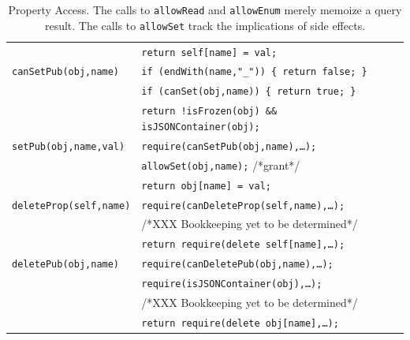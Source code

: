 \documentclass[letterpaper,twocolumn,10pt]{article}
\newcommand{\code}[1]{{\tt {#1}}}              %
\begin{document}
\begin{table}
\begin{tabular}{ll}
       & \code{return self[name] = val;} \\
  \code{canSetPub(obj,name)}
       & \code{if (endWith(name,"\_"))\ \{ return false; \}} \\
       & \code{if (canSet(obj,name))\ \{ return true; \}} \\
       & \code{return !isFrozen(obj) \&\& isJSONContainer(obj);} \\
  \code{setPub(obj,name,val)}
       & \code{require(canSetPub(obj,name),\ldots);} \\
       & \code{allowSet(obj,name);} /*grant*/ \\
       & \code{return obj[name] = val;} \\
  \hline               
  \code{deleteProp(self,name)} 
       & \code{require(canDeleteProp(self,name),\ldots);} \\
       & /*XXX Bookkeeping yet to be determined*/ \\
       & \code{return require(delete self[name],\ldots);} \\
  \code{deletePub(obj,name)} 
       & \code{require(canDeletePub(obj,name),\ldots);} \\
       & \code{require(isJSONContainer(obj),\ldots);} \\
       & /*XXX Bookkeeping yet to be determined*/ \\
       & \code{return require(delete obj[name],\ldots);}
\end{tabular}

\caption[Property Access.]{Property Access. The calls to \code{allowRead} and
\code{allowEnum} merely memoize a query result. The calls to \code{allowSet}
track the implications of side effects.}
\label{tab:prop-access}
\end{table}
\end{document}
